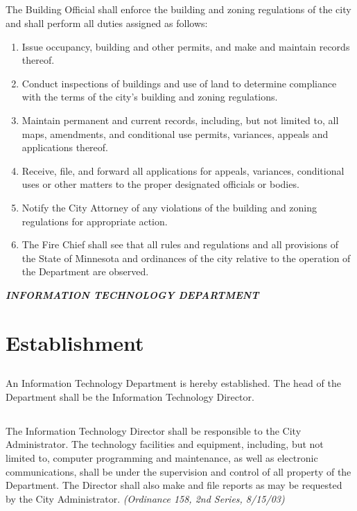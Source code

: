 \subsection{}
The Building Official shall enforce the building and zoning regulations of the city and shall perform all duties assigned as follows:
\begin{enumerate}
\item Issue occupancy, building and other permits, and make and maintain records thereof.
\item Conduct inspections of buildings and use of land to determine compliance with the terms of the city’s building and zoning regulations.
\item Maintain permanent and current records, including, but not limited to, all maps, amendments, and conditional use permits, variances, appeals and applications thereof.
\item Receive, file, and forward all applications for appeals, variances, conditional uses or other matters to the proper designated officials or bodies.
\item Notify the City Attorney of any violations of the building and zoning regulations for appropriate action.
\item The Fire Chief shall see that all rules and regulations and all provisions of the State of Minnesota and ordinances of the city relative to the operation of the Department are observed.
\end{enumerate}

\centerline{\textbf{\emph{\LARGE{INFORMATION TECHNOLOGY DEPARTMENT}}}}
\setcounter{section}{49}
\section{Establishment}
\subsection{}
An Information Technology Department is hereby established. The head of the Department shall be the Information Technology Director.
\subsection{}
The Information Technology Director shall be responsible to the City Administrator. The technology facilities and equipment, including, but not limited to, computer programming and maintenance, as well as electronic communications, shall be under the supervision and control of all property of the Department. The Director shall also make and file reports as may be requested by the City Administrator.\newline
\emph{(Ordinance 158, 2nd Series, 8/15/03)}\newline

